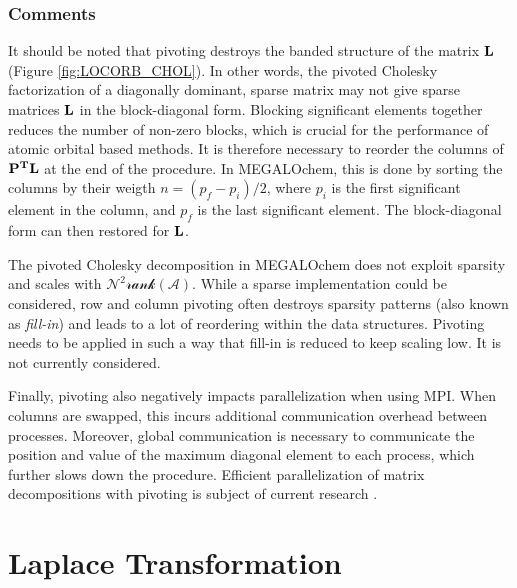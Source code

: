 \subsubsection{Comments}

It should be noted that pivoting destroys the banded structure of the matrix $\mathbf{L}$ (Figure \ref{fig:LOCORB_CHOL}). In other words, the pivoted Cholesky factorization of a diagonally dominant, sparse matrix may not give sparse matrices $\mathbf{L}$ in the block-diagonal form. Blocking significant elements together reduces the number of non-zero blocks, which is crucial for the performance of atomic orbital based methods. It is therefore necessary to reorder the columns of $\mathbf{P^TL}$ at the end of the procedure. In MEGALOchem, this is done by sorting the columns by their weigth $n = (p_f - p_i) / 2$, where $p_i$ is the first significant element in the column, and $p_f$ is the last significant element. The block-diagonal form can then restored for $\mathbf{L}$. 

The pivoted Cholesky decomposition in MEGALOchem does not exploit sparsity and scales with $\mathcal{N^2rank(A)}$. While a sparse implementation could be considered, row and column pivoting often destroys sparsity patterns (also known as \emph{fill-in}) and leads to a lot of reordering within the data structures. Pivoting needs to be applied in such a way that fill-in is reduced to keep scaling low. It is not currently considered.

Finally, pivoting also negatively impacts parallelization when using MPI. When columns are swapped, this incurs additional communication overhead between processes. Moreover, global communication is necessary to communicate the position and value of the maximum diagonal element to each process, which further slows down the procedure. Efficient parallelization of matrix decompositions with pivoting is subject of current research \cite{Xia2016,Xia2017}.

\section{Laplace Transformation \label{sec:LAPLACE}}


